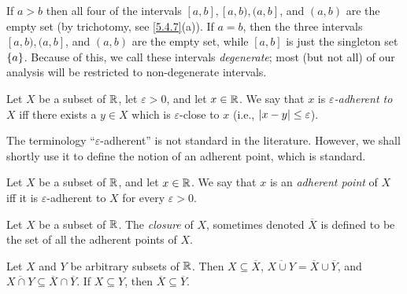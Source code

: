 \begin{eg}\label{9.1.4}
	If \(a > b\) then all four of the intervals \([a, b], [a, b), (a, b]\), and \((a, b)\) are the empty set (by trichotomy, see \cref{5.4.7}(a)).
	If \(a = b\), then the three intervals \([a, b), (a, b]\), and \((a, b)\) are the empty set, while \([a, b]\) is just the singleton set \(\left\lbrace a\right\rbrace\).
	Because of this, we call these intervals \emph{degenerate};
	most (but not all) of our analysis will be restricted to non-degenerate intervals.
\end{eg}

\begin{defn}\label{9.1.5}
	Let \(X\) be a subset of \(\mathbb{R}\), let \(\varepsilon > 0\), and let \(x \in \mathbb{R}\).
	We say that \(x\) is \emph{\(\varepsilon\)-adherent to \(X\)} iff there exists a \(y \in X\) which is \(\varepsilon\)-close to \(x\)
	(i.e., \(\left\lvert x - y\right\rvert \leq \varepsilon\)).
\end{defn}

\begin{rmk}\label{9.1.6}
	The terminology ``\(\varepsilon\)-adherent'' is not standard in the literature.
	However, we shall shortly use it to define the notion of an adherent point, which is standard.
\end{rmk}

\setcounter{thm}{7}
\begin{defn}\label{9.1.8}
	Let \(X\) be a subset of \(\mathbb{R}\), and let \(x \in \mathbb{R}\).
	We say that \(x\) is an \emph{adherent point} of \(X\) iff it is \(\varepsilon\)-adherent to \(X\) for every \(\varepsilon > 0\).
\end{defn}

\setcounter{thm}{9}
\begin{defn}[Closure]\label{9.1.10}
	Let \(X\) be a subset of \(\mathbb{R}\).
	The \emph{closure} of \(X\), sometimes denoted \(\overline{X}\) is defined to be the set of all the adherent points of \(X\).
\end{defn}

\begin{lem}\label{9.1.11}
	Let \(X\) and \(Y\) be arbitrary subsets of \(\mathbb{R}\).
	Then \(X \subseteq \overline{X}\), \(\overline{X \cup Y} = \overline{X} \cup \overline{Y}\), and \(\overline{X \cap Y} \subseteq \overline{X} \cap \overline{Y}\).
	If \(X \subseteq Y\), then \(\overline{X} \subseteq \overline{Y}\).
\end{lem}


